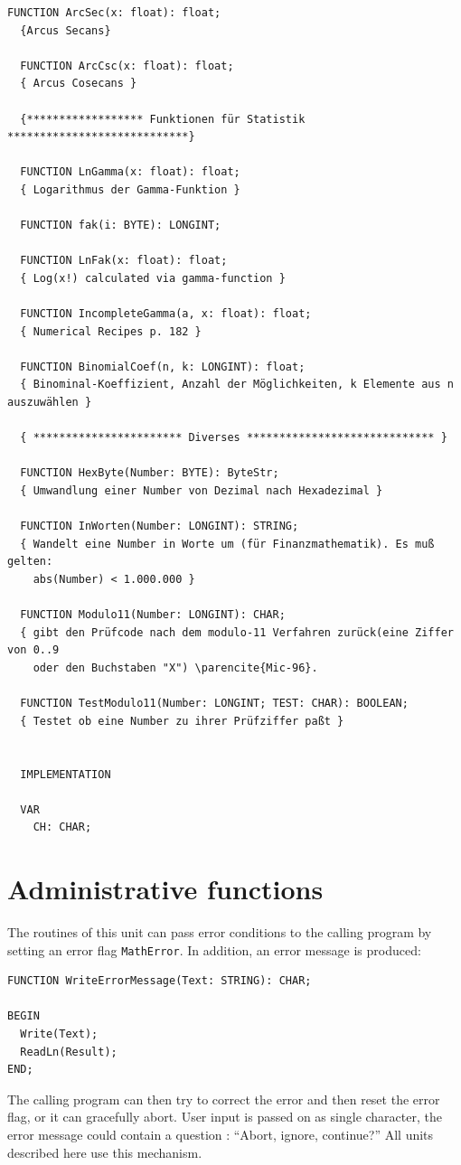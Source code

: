 \begin{refsection}
\begin{lstlisting}[caption=Interface of unit MathFunc]
  FUNCTION ArcSec(x: float): float;
  {Arcus Secans}

  FUNCTION ArcCsc(x: float): float;
  { Arcus Cosecans }

  {****************** Funktionen für Statistik ****************************}

  FUNCTION LnGamma(x: float): float;
  { Logarithmus der Gamma-Funktion }

  FUNCTION fak(i: BYTE): LONGINT;

  FUNCTION LnFak(x: float): float;
  { Log(x!) calculated via gamma-function }

  FUNCTION IncompleteGamma(a, x: float): float;
  { Numerical Recipes p. 182 }

  FUNCTION BinomialCoef(n, k: LONGINT): float;
  { Binominal-Koeffizient, Anzahl der Möglichkeiten, k Elemente aus n auszuwählen }

  { *********************** Diverses ***************************** }

  FUNCTION HexByte(Number: BYTE): ByteStr;
  { Umwandlung einer Number von Dezimal nach Hexadezimal }

  FUNCTION InWorten(Number: LONGINT): STRING;
  { Wandelt eine Number in Worte um (für Finanzmathematik). Es muß gelten:
    abs(Number) < 1.000.000 }

  FUNCTION Modulo11(Number: LONGINT): CHAR;
  { gibt den Prüfcode nach dem modulo-11 Verfahren zurück(eine Ziffer von 0..9
    oder den Buchstaben "X") \parencite{Mic-96}.

  FUNCTION TestModulo11(Number: LONGINT; TEST: CHAR): BOOLEAN;
  { Testet ob eine Number zu ihrer Prüfziffer paßt }


  IMPLEMENTATION

  VAR
    CH: CHAR;
\end{lstlisting}

\section{Administrative functions}

The routines of this unit can pass error conditions to the calling program by setting an error flag \texttt{MathError}. In addition, an error message is produced:
\begin{lstlisting}[caption=Error handling]
FUNCTION WriteErrorMessage(Text: STRING): CHAR;

BEGIN
  Write(Text);
  ReadLn(Result);
END;
\end{lstlisting}
The calling program can then try to correct the error and then reset the error flag, or it can gracefully abort. User input is passed on as single character, the error message could contain a question : ``Abort, ignore, continue?''  All units described here use this mechanism.


\end{refsection}
